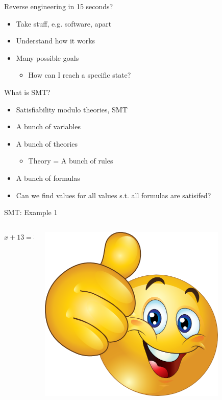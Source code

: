 \documentclass[10pt, compress]{beamer}
\begin{document}
\begin{frame}{Reverse engineering in 15 seconds?}

 \begin{itemize}
  \item Take stuff, e.g. software, apart
  \item Understand how it works
  \item Many possible goals
  \begin{itemize}
  	\item How can I reach a specific state?
  \end{itemize}  
  \end{itemize}    

\end{frame}

\begin{frame}{What is SMT?}

  \begin{itemize}
  \item Satisfiability modulo theories, SMT
  \item A bunch of variables
  \item A bunch of theories
  \begin{itemize}
    \item Theory = A bunch of rules
  \end{itemize}  
  \item A bunch of formulas
  \item Can we find values for all values s.t. all formulas are satisifed?
  \end{itemize}   

\end{frame}

\begin{frame}{SMT: Example 1}

	\begin{columns}
		\begin{column}{0.7\textwidth}
			\huge{$ x+13=37 $}
		\end{column}
		\begin{column}{0.3\textwidth}
			\includegraphics[width=0.8\textwidth]{images/happy.png}
		\end{column}
	\end{columns}
 
\end{frame}
\end{document}
